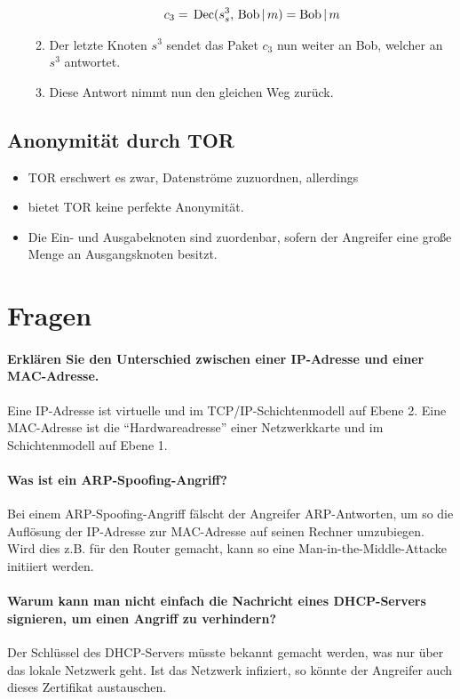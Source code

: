 \begin{itemize}
\begin{enumerate}
\begin{align*}
								c_3 & =\, \operatorname{Dec}(s^3_s,\, \text{Bob} \,\vert\, m) = \text{Bob} \,\vert\, m                                                                                                                     \\
							\end{align*}
						\item Der letzte Knoten \(s^3\) sendet das Paket \(c_3\) nun weiter an Bob, welcher an \(s^3\) antwortet.
						\item Diese Antwort nimmt nun den gleichen Weg zurück.
					\end{enumerate}
			\end{itemize}

		\subsection{Anonymität durch TOR}
			\begin{itemize}
				\item TOR erschwert es zwar, Datenströme zuzuordnen, allerdings
				\item bietet TOR keine perfekte Anonymität.
				\item Die Ein- und Ausgabeknoten sind zuordenbar, sofern der Angreifer eine große Menge an Ausgangsknoten besitzt.
			\end{itemize}

	\section{Fragen}
		\paragraph{Erklären Sie den Unterschied zwischen einer IP-Adresse und einer MAC-Adresse.}
			Eine IP-Adresse ist virtuelle und im TCP/IP-Schichtenmodell auf Ebene 2. Eine MAC-Adresse ist die \enquote{Hardwareadresse} einer Netzwerkkarte und im Schichtenmodell auf Ebene 1.

		\paragraph{Was ist ein ARP-Spoofing-Angriff?}
			Bei einem ARP-Spoofing-Angriff fälscht der Angreifer ARP-Antworten, um so die Auflösung der IP-Adresse zur MAC-Adresse auf seinen Rechner umzubiegen. Wird dies z.B. für den Router gemacht, kann so eine Man-in-the-Middle-Attacke initiiert werden.

		\paragraph{Warum kann man nicht einfach die Nachricht eines DHCP-Servers signieren, um einen Angriff zu verhindern?}
			Der Schlüssel des DHCP-Servers müsste bekannt gemacht werden, was nur über das lokale Netzwerk geht. Ist das Netzwerk infiziert, so könnte der Angreifer auch dieses Zertifikat austauschen.

